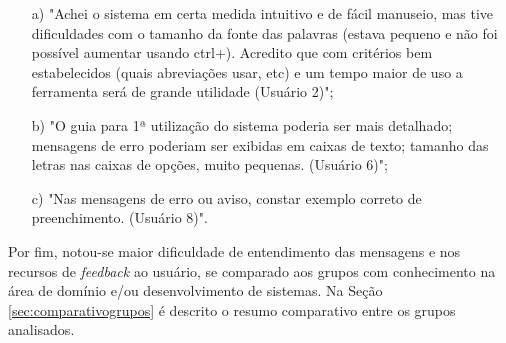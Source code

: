 \begin{enumerate}
    \item [a)] "Achei o sistema em certa medida intuitivo e de fácil manuseio, mas tive dificuldades com o tamanho da fonte das palavras (estava pequeno e não foi possível aumentar usando ctrl+). Acredito que com critérios bem estabelecidos (quais abreviações usar, etc) e um tempo maior de uso a ferramenta será de grande utilidade (Usuário 2)";
    \item[b)] "O guia para 1ª utilização do sistema poderia ser mais detalhado; mensagens de erro poderiam ser exibidas em caixas de texto; tamanho das letras nas caixas de opções, muito pequenas. (Usuário 6)";
    \item[c)] "Nas mensagens de erro ou aviso, constar exemplo correto de preenchimento. (Usuário 8)".   
\end{enumerate}

Por fim, notou-se maior dificuldade de entendimento das mensagens e nos recursos de \textit{feedback} ao usuário, se comparado aos grupos com conhecimento na área de domínio e/ou desenvolvimento de sistemas. Na Seção \ref{sec:comparativogrupos} é descrito o resumo comparativo entre os grupos analisados.










